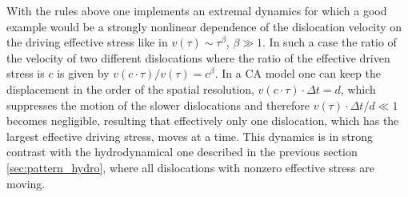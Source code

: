 With the rules above one implements an extremal dynamics for which a good example would be a strongly nonlinear dependence of the dislocation velocity on the driving effective stress like in $v\left( \tau  \right) \sim {\tau ^\beta }$, $\beta \gg 1$. In such a case the ratio of the velocity of two different dislocations where the ratio of the effective driven stress is $c$ is given by $v\left( {c \cdot \tau } \right)/v\left( \tau  \right) = {c^\beta }$. In a CA model one can keep the displacement in the order of the spatial resolution, $v\left( {c \cdot \tau } \right) \cdot \Delta t = d$, which suppresses the motion of the slower dislocations and therefore $v\left( \tau  \right) \cdot \Delta t/d \ll 1$ becomes negligible, resulting that effectively only one dislocation, which has the largest effective driving stress,  moves at a time. This dynamics is in strong contrast with the hydrodynamical one described in the previous section \ref{sec:pattern_hydro}, where all dislocations with nonzero effective stress are moving.

